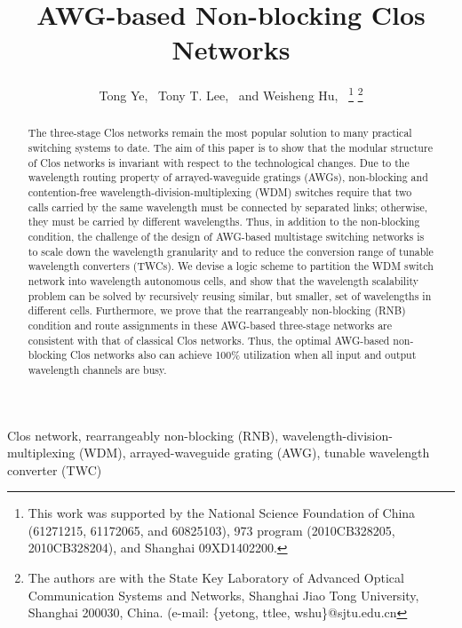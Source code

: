 \documentclass[journal]{IEEEtran}
\begin{document}
\title{AWG-based Non-blocking Clos Networks}


\author{Tong Ye,~
        Tony T. Lee,~
        and Weisheng Hu,~
\thanks{This work was supported by the National Science Foundation of China (61271215, 61172065, and 60825103),
973 program (2010CB328205, 2010CB328204), and Shanghai 09XD1402200. }
\thanks{The authors are with the State Key Laboratory of Advanced Optical Communication
Systems and Networks, Shanghai Jiao Tong University, Shanghai
200030, China. (e-mail: \{yetong, ttlee, wshu\}@sjtu.edu.cn}}



\maketitle

\begin{abstract}
The three-stage Clos networks remain the most popular solution to
many practical switching systems to date. The aim of this paper is
to show that the modular structure of Clos networks is invariant
with respect to the technological changes. Due to the wavelength
routing property of arrayed-waveguide gratings (AWGs), non-blocking
and contention-free wavelength-division-multiplexing (WDM) switches
require that two calls carried by the same wavelength must be
connected by separated links; otherwise, they must be carried by
different wavelengths. Thus, in addition to the non-blocking
condition, the challenge of the design of AWG-based multistage
switching networks is to scale down the wavelength granularity and
to reduce the conversion range of tunable wavelength converters
(TWCs). We devise a logic scheme to partition the WDM switch network
into wavelength autonomous cells, and show that the wavelength
scalability problem can be solved by recursively reusing similar,
but smaller, set of wavelengths in different cells. Furthermore, we
prove that the rearrangeably non-blocking (RNB) condition and route
assignments in these AWG-based three-stage networks are consistent
with that of classical Clos networks. Thus, the optimal AWG-based
non-blocking Clos networks also can achieve 100\% utilization when
all input and output wavelength channels are busy.
\end{abstract}

\begin{IEEEkeywords}
Clos network, rearrangeably non-blocking (RNB),
wavelength-division-multiplexing (WDM), arrayed-waveguide grating
(AWG), tunable wavelength converter (TWC)
\end{IEEEkeywords}
\end{document}
